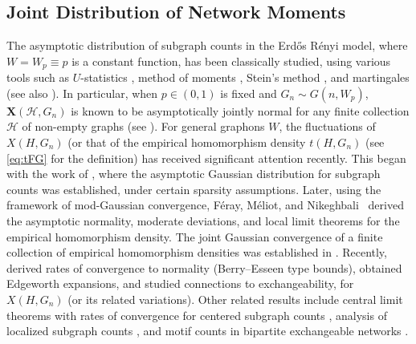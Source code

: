 \documentclass[11pt,reqno]{amsart}
\numberwithin{equation}{section}
\newcommand{\cH}{{\mathcal H}}
\theoremstyle{definition}
\begin{document}
\subsection{Joint Distribution of Network Moments}
\label{sec:distribution}



The asymptotic distribution of subgraph counts in the Erd\H{o}s R\'enyi  model, where $W = W_p  \equiv p$ is a constant function, has been classically studied, using various tools such as $U$-statistics \cite{Nowicki1989,nowicki1988subgraph}, 
method of moments \cite{rucinski1988small},  Stein's method \cite{barbour1989central},  and martingales 
\cite{SJ79, SJ94} (see also \cite[Chapter 6]{JLR}). 
In particular, when $p \in (0, 1)$ is fixed and $G_n \sim G(n, W_p)$, $\bm{X}(\cH, G_n)$ is known to be asymptotically  jointly normal for any finite collection $\cH$ of non-empty graphs (see \cite[Section 9]{janson1991asymptotic}).  For general graphons $W$, the fluctuations of $X(H, G_n)$ (or that of the empirical homomorphism density $t(H, G_n)$ (see \eqref{eq:tFG} for the definition) has received significant attention recently. This began with the work of \citet{bickel2011method}, where the asymptotic Gaussian distribution for subgraph counts was established, under certain sparsity assumptions. Later, using the framework of mod-Gaussian convergence,  F{\'e}ray, M{\'e}liot, and Nikeghbali~\cite{feray2020graphons} derived the asymptotic normality, moderate deviations, and local limit theorems for the empirical homomorphism density. 
The joint Gaussian convergence of a finite collection of empirical homomorphism densities was established in \citet{delmas2021asymptotic}. Recently, \citet{zhang2021berryesseen} derived rates of convergence to
normality (Berry--Esseen type bounds), \citet{zhang2022edgeworth} obtained Edgeworth expansions, and \citet{invariant2022limit} studied connections to exchangeability, for $X(H, G_n)$ (or its related variations). Other related results include central limit theorems with rates of convergence for centered subgraph counts \cite{kaur2021higher}, analysis of localized subgraph counts \cite{maugis2020central}, and motif counts in bipartite exchangeable networks \cite{le2023networkstatistics}.
\end{document}

